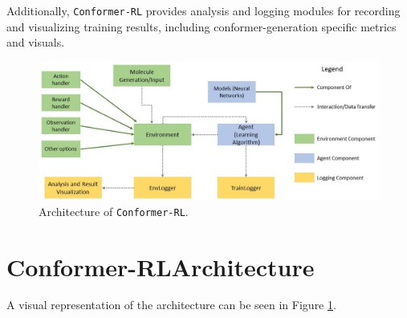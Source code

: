 \documentclass[twoside,11pt]{article}
\newcommand{\code}[1]{\texttt{#1}}
\newcommand{\titleofpaper}{Conformer-RL}
\newcommand{\genComment}[2]{\ifnum\comments=1{\color{#1}{\textsf{\footnotesize #2}}}\fi}
\newcommand{\tarun}[1] {\genComment{blue}{[TG: #1]}}
\newcommand{\paul}[1]{\genComment{brown}{[PZ:#1]}}
\newcommand{\runxuan}[1]{\genComment{pink}{[RJ:#1]}}
\begin{document}
Additionally, \code{\titleofpaper} provides analysis and logging modules for recording and visualizing training results, including conformer-generation specific metrics and visuals.

\begin{figure}[h]
  \centering
  \includegraphics[width=\textwidth]{architectures.jpg}
  \caption{Architecture of \code{\titleofpaper}. 
  }
  \label{fig:architecture}
\end{figure}

\section{\titleofpaper \space Architecture}
  A visual representation of the architecture can be seen in Figure \ref{fig:architecture}.
\end{document}
